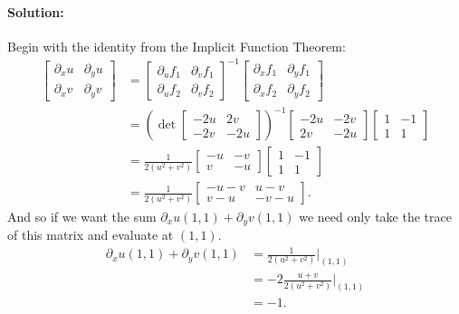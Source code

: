 \documentclass{article}
\begin{document}
\begin{enumerate}
\begin{enumerate}[label= (\alph*)]
        \paragraph{Solution: }Begin with the identity from the Implicit Function Theorem:
        \begin{align*}
            \begin{bmatrix}  \partial_x u&\partial_y u\\\partial_x v&\partial_y v\end{bmatrix} 
            &= \begin{bmatrix}  \partial_u f_1&\partial_v f_1\\\partial_u f_2&\partial_v f_2\end{bmatrix}^{-1}
            \begin{bmatrix}  \partial_x f_1&\partial_y f_1\\\partial_x f_2&\partial_y f_2\end{bmatrix}\\
               &=\left(\det\begin{bmatrix} -2u&2v\\-2v&-2u\end{bmatrix}\right)^{-1}  \begin{bmatrix} -2u&-2v\\2v&-2u\end{bmatrix}
            \begin{bmatrix} 1&-1\\1&1 \end{bmatrix} \\
            &= \frac{1}{2(u^2+v^2)} \begin{bmatrix} -u&-v\\v&-u\end{bmatrix}
            \begin{bmatrix} 1&-1\\1&1 \end{bmatrix} \\
                 &= \frac{1}{2(u^2+v^2)} \begin{bmatrix} -u-v&u-v\\v-u&-v-u \end{bmatrix}
        .\end{align*}
        And so if we want the sum $\partial_x u(1,1)+\partial_y v(1,1)$ we need only take the trace of this matrix and evaluate at $(1,1)$.
        \begin{align*}
             \partial_x u(1,1)+\partial_y v(1,1)&= \frac{1}{2(u^2+v^2)} \bigg|_{(1,1)}\\
             &= -2\frac{u+v}{2(u^2+v^2)} \bigg|_{(1,1)}\\
             &= -1 
        .\end{align*}
\end{enumerate}


\end{enumerate}
\end{document}
